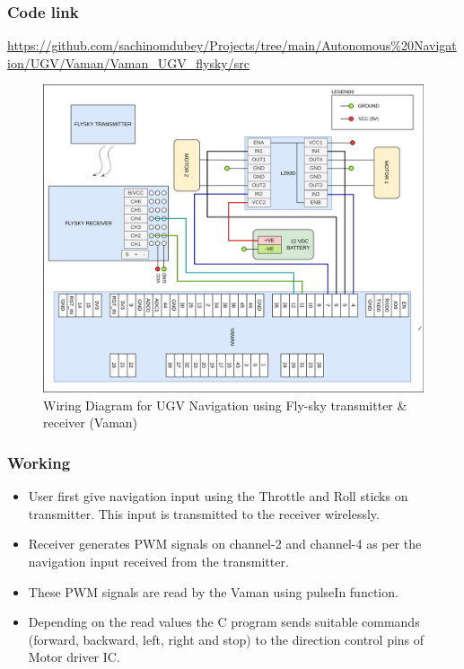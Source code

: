 \subsubsection{Code link} \label{Code_link_UGV_flysky_vaman}
\begin{tcolorbox}
\url{https://github.com/sachinomdubey/Projects/tree/main/Autonomous\%20Navigation/UGV/Vaman/Vaman_UGV_flysky/src}
\end{tcolorbox}

\begin{figure}[h!]
\centering
\includegraphics[width=\columnwidth]{./Figures/Wiring_UGV_flysky_Vaman.png}
\caption{Wiring Diagram for UGV Navigation using Fly-sky transmitter \& receiver (Vaman)}
\label{Wiring_UGV_flysky_Vaman}
\end{figure}

\subsubsection{Working}
\begin{itemize}
    \item User first give navigation input using the Throttle and Roll sticks on transmitter. This input is transmitted to the receiver wirelessly.
    \item Receiver generates PWM signals on channel-2 and channel-4 as per the navigation input received from the transmitter.
    \item These PWM signals are read by the Vaman using pulseIn function.
    \item Depending on the read values the C program sends suitable commands (forward, backward, left, right and stop) to the direction control pins of Motor driver IC.
\end{itemize}

